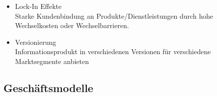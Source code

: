 \documentclass[12pt,a4paper]{article}
\begin{document}
\begin{itemize}
\begin{itemize}
\begin{minipage}[t]{0.3\textwidth}
                  \end{minipage}
            \item Lock-In Effekte\\
                  Starke Kundenbindung an Produkte/Dienstleistungen durch hohe Wechselkosten oder Wechselbarrieren.
            \item Versionierung\\
                  Informationsprodukt in verschiedenen Versionen für verschiedene Marktsegmente anbieten
         \end{itemize}
\end{itemize}


\vspace{1cm}
\subsection{Geschäftsmodelle} %
\end{document}
